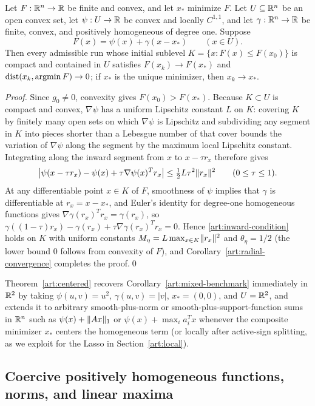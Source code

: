 \begin{theorem}\label{art:centered}
Let $F:\mathbb R^n\to\mathbb R$ be finite and convex, and let $x_*$ minimize $F$. Let
$U\subseteq\mathbb R^n$ be an open convex set, let $\psi:U\to\mathbb R$ be convex and locally
$C^{1,1}$, and let $\gamma:\mathbb R^n\to\mathbb R$ be finite, convex, and positively
homogeneous of degree one. Suppose
\[
 F(x)=\psi(x)+\gamma(x-x_*)\qquad(x\in U).
\]
Then every admissible run whose initial sublevel $K=\{x:F(x)\le F(x_0)\}$ is
compact and contained in $U$ satisfies $F(x_k)\to F(x_*)$ and
$\operatorname{dist}(x_k,\operatorname{argmin} F)\to0$; if $x_*$ is the unique minimizer, then $x_k\to x_*$.
\end{theorem}
\begin{proof}
Since $g_0\ne0$, convexity gives $F(x_0)>F(x_*)$. Because $K\subset U$ is
compact and convex, $\nabla\psi$ has a uniform Lipschitz constant $L$ on $K$:
covering $K$ by finitely many open sets on which $\nabla\psi$ is Lipschitz and
subdividing any segment in $K$ into pieces shorter than a Lebesgue number of
that cover bounds the variation of $\nabla\psi$ along the segment by the
maximum local Lipschitz constant. Integrating along the inward segment from $x$
to $x-\tau r_x$ therefore gives
\[
 \left|\psi(x-\tau r_x)-\psi(x)+\tau\nabla\psi(x)^Tr_x\right|
 \le\tfrac12L\tau^2\lVert r_x\rVert^2\qquad(0\le\tau\le1).
\]
At any differentiable point $x\in K$ of $F$, smoothness of $\psi$ implies that
$\gamma$ is differentiable at $r_x=x-x_*$, and Euler's identity for degree-one
homogeneous functions gives $\nabla\gamma(r_x)^Tr_x=\gamma(r_x)$, so
$\gamma((1-\tau)r_x)-\gamma(r_x)+\tau\nabla\gamma(r_x)^Tr_x=0$. Hence
\eqref{art:inward-condition} holds on $K$ with uniform constants
$M_\eta=L\max_{x\in K}\lVert r_x\rVert^2$ and $\theta_\eta=1/2$ (the lower bound $0$
follows from convexity of $F$), and Corollary~\ref{art:radial-convergence}
completes the proof.\qed
\end{proof}

Theorem~\ref{art:centered} recovers
Corollary~\ref{art:mixed-benchmark} immediately in $\mathbb R^2$ by taking
$\psi(u,v)=u^2$, $\gamma(u,v)=|v|$, $x_*=(0,0)$, and $U=\mathbb R^2$, and extends it
to arbitrary smooth-plus-norm or smooth-plus-support-function sums in $\mathbb R^n$
such as $\psi(x)+\lVert Ax\rVert_1$ or $\psi(x)+\max_ia_i^Tx$ whenever the composite
minimizer $x_*$ centers the homogeneous term (or locally after active-sign
splitting, as we exploit for the Lasso in Section~\ref{art:local}).

\subsection{Coercive positively homogeneous functions, norms, and linear maxima}

